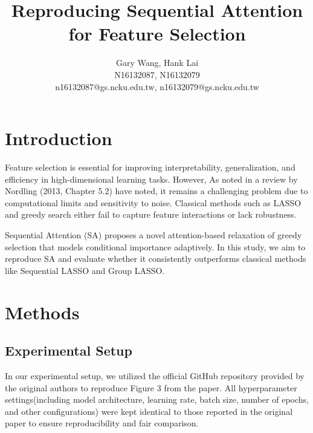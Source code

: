 \documentclass[a4paper,twocolumn]{article} %
\begin{document}

\title{Reproducing Sequential Attention for Feature Selection}
\author{Gary Wang, Hank Lai \\ N16132087, N16132079 \\ n16132087@gs.ncku.edu.tw, n16132079@gs.ncku.edu.tw} 

\maketitle                     %





\section{Introduction}

Feature selection is essential for improving interpretability, generalization, and efficiency in high-dimensional learning tasks.
 However, As noted in a review by Nordling (2013, Chapter 5.2) have noted, it remains a challenging problem due to 
computational limits and sensitivity to noise. Classical methods such as LASSO and greedy search either fail to capture feature interactions or lack robustness.

Sequential Attention (SA) proposes a novel attention-based relaxation of greedy selection that models conditional importance adaptively. 
In this study, we aim to reproduce SA and evaluate whether it consistently outperforms classical methods 
like Sequential LASSO and Group LASSO.


\section{Methods}

\subsection{Experimental Setup}
In our experimental setup, we utilized the official GitHub repository provided by the original authors to reproduce Figure 3 from the paper. All hyperparameter settings(including model architecture, learning rate, batch size, number of epochs, and other configurations) were kept identical to those reported in the original paper to ensure reproducibility and fair comparison.
\end{document}
